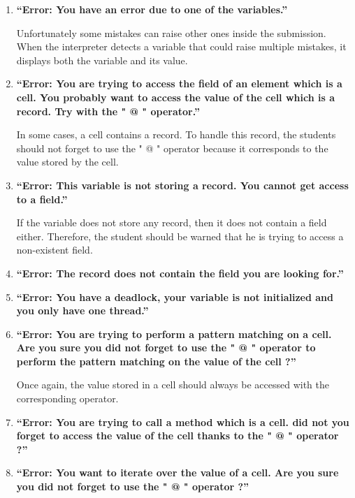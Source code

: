 \documentclass[11pt,a4paper,twoside,openright]{report}
\begin{document}
\begin{enumerate}
\item \textbf{\enquote{Error: You have an error due to one of the variables.}}

Unfortunately some mistakes can raise other ones inside the submission. When 
the interpreter detects a variable that could raise multiple mistakes, it 
displays both the variable and its value.

\item \textbf{\enquote{Error: You are trying to access the field of an element which 
is 
a cell. You probably want to access the value of the cell which is a record. 
Try with the " @ " operator.}} 

In some cases, a cell contains a record. To handle this record, the students 
should not forget to use the " @ " operator because it corresponds to the value 
stored by the cell.

\item \textbf{\enquote{Error: This variable is not storing a record. You cannot get
access to a field.}} 

If the variable does not store any record, then it does not contain a field 
either. Therefore, the student should be warned that he is trying to access a 
non-existent field.

\item \textbf{\enquote{Error: The record does not contain the field you are looking 
for.}}

\item \textbf{\enquote{Error: You have a deadlock, your variable is not initialized 
and 
you only have one thread.}}

\item \textbf{\enquote{Error: You are trying to perform a pattern matching on a cell. 
Are you sure you did not forget to use the " @ " operator to perform the pattern 
matching on the value of the cell ?}}

Once again, the value stored in a cell should always be accessed with the 
corresponding operator.

\item \textbf{\enquote{Error: You are trying to call a method which is a cell. did not 
you forget to access the value of the cell thanks to the " @ " operator ?}}

\item \textbf{\enquote{Error: You want to iterate over the value of a cell. Are you 
sure you did not forget to use the " @ " operator ?}}


\end{enumerate}
\end{document}

